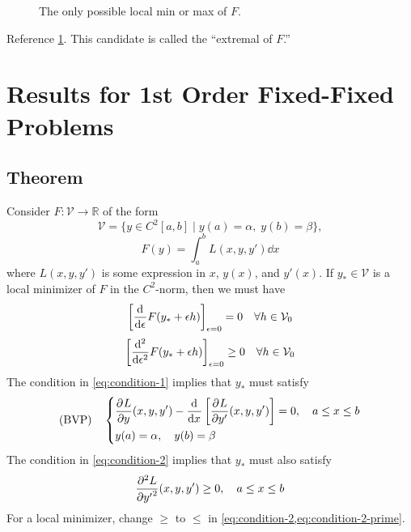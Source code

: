 \documentclass[12pt,twoside]{article}
\begin{document}
\begin{enumerate}
\begin{figure}[ht]
  \centering
  \caption{The only possible local min or max of $F$.}
  \label{fig:extremal}
\end{figure}
Reference \cref{fig:extremal}. This candidate is called the ``extremal of $F$.''
\end{enumerate}

\section{Results for 1st Order Fixed-Fixed Problems}
\subsection{Theorem}
Consider $F:\mathcal{V}\rightarrow\mathbb{R}$ of the form
$$\mathcal{V}=\{y\in C^2[a,b]\;|\;y(a)=\alpha,\;y(b)=\beta\},$$
$$F(y)=\int_a^bL(x,y,y')\dd{x}$$
where $L(x,y,y')$ is some expression in $x$, $y(x)$, and $y'(x)$.
If $y_*\in\mathcal{V}$ is a local minimizer of $F$ in the $C^2$-norm, then we
must have
\begin{equation}
  \label{eq:condition-1}
  \left[\od{}{\epsilon}F(y_*+\epsilon h)\right]_{\epsilon=0}=0\quad\forall h\in\mathcal{V}_0
\end{equation}
\begin{equation}
  \label{eq:condition-2}
  \left[\od[2]{}{\epsilon}F(y_*+\epsilon h)\right]_{\epsilon=0}\ge0  \quad\forall h\in\mathcal{V}_0
\end{equation}
The condition in \cref{eq:condition-1} implies that $y_*$ must satisfy
\begin{equation}
  \label{eq:condition-1-prime}
  \text{(BVP)}\quad\left\{
  \begin{aligned}
    &\pd{L}{y}(x,y,y')-\od{}{x}\left[ \pd{L}{y'}(x,y,y') \right]=0,\quad a\le x\le b \\
    &y(a) = \alpha,\quad y(b)=\beta
  \end{aligned} \right.
\end{equation}
The condition in \cref{eq:condition-2} implies that $y_*$ must also satisfy
\begin{equation}
  \label{eq:condition-2-prime}
  \pd[2]{L}{y'}(x,y,y')\ge0,\quad a\le x \le b
\end{equation}
For a local minimizer, change $\ge$ to $\le$ in \cref{eq:condition-2,eq:condition-2-prime}.
\end{document}
